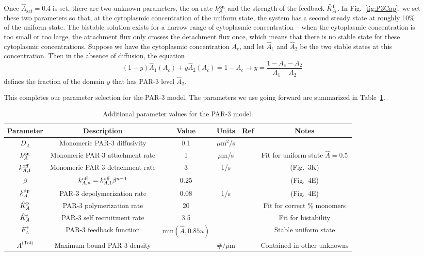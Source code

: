 \documentclass[11pt]{article}
\newcommand{\6}[1]{#1_{\text{6}}}
\newcommand{\3}[1]{#1_{\text{3}}}
\newcommand{\Tot}[1]{#1^\text{(Tot)}}
\newcommand{\A}[1]{#1_A}
\begin{document}
Once $\hat A_\text{sat}=0.4$ is set, there are two unknown parameters, the on rate $k^\text{on}_A$ and the strength of the feedback $\hat{K}^\text{f}_A$. In Fig.\ \ref{fig:P3Cap}, we set these two parameters so that, at the cytoplasmic concentration of the uniform state, the system has a second steady state at roughly 10\% of the uniform state. The bistable solution exists for a narrow range of cytoplasmic concentration -- when the cytoplasmic concentration is too small or too large, the attachment flux only crosses the detachment flux once, which means that there is no stable state for these cytoplasmic concentrations. Suppose we have the cytoplasmic concentration $A_c$, and let $\hat A_1$ and $\hat A_2$ be the two stable states at this concentration. Then in the absence of diffusion, the equation 
\begin{equation}
\label{eq:NoDiffEqn}
(1-y)\hat{A}_1\left(A_c\right)+y \hat{A}_2\left(A_c\right)=1-A_c \rightarrow y = \frac{1-A_c-A_2}{A_1-A_2}
\end{equation}
defines the fraction of the domain $y$ that has PAR-3 level $\hat A_2$.

This completes our parameter selection for the PAR-3 model. The parameters we use going forward are summarized in Table\ \ref{tab:paramsP3}.


\begin{table}
\begin{small}
\centering
\begin{tabular}{|c|c|c|c|c|c|}\hline
Parameter & Description & Value & Units & Ref & Notes \\ \hline
$\A{D} $ & Monomeric PAR-3 diffusivity & 0.1 & $\mu$m$^2$/s & \cite{lang2023oligomerization} & \\
$\A{\kon}$ & Monomeric PAR-3 attachment rate & 1& $\mu$m/s & & Fit for uniform state $\hat A=0.5$ \\
$k^\text{off}_{A,1}$ & Monomeric PAR-3 detachment rate &  3& 1/s & \cite{lang2023oligomerization} & (Fig.\ 3K)\\
$\beta$ & $k^\text{off}_{A,n}=k^\text{off}_{A,1}\beta^{n-1}$ & 0.25 & & \cite{lang2023oligomerization} & (Fig.\ 4E) \\
$\A{\kdp}$ & PAR-3 depolymerization rate & 0.08 & 1/s & \cite{lang2023oligomerization} & (Fig.\ 4E) \\
$\hat{K}^\text{p}_A$ & PAR-3 polymerization rate & 20 & & & Fit for correct \% monomers \cite{lang2023oligomerization}  \\
$\hat{K}^\text{f}_A$ & PAR-3 self recruitment rate &3.5 & & & Fit for bistability\\
$F_A^+$ & PAR-3 feedback function &$\text{min}\left(\hat A,0.85u\right)$ &  &\cite{lang2022oligomerization} &  Stable uniform state\\
$\Tot{A}$ & Maximum bound PAR-3 density & -- & $\#/\mu$m & & Contained in other unknowns \\ \hline
\end{tabular}
\caption{\label{tab:paramsP3}Additional parameter values for the PAR-3 model. }
\end{small}
\end{table}
\end{document}
